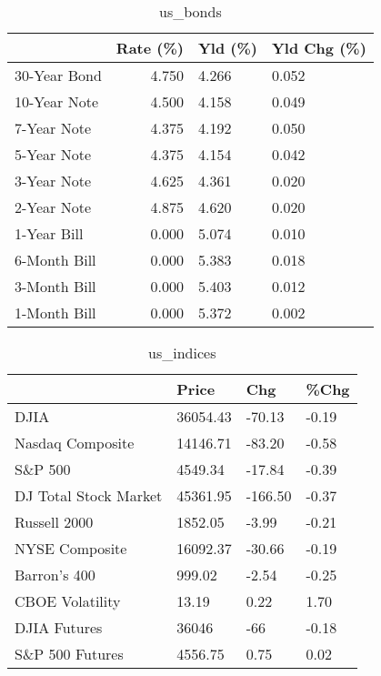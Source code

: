 \documentclass{article}%
\begin{document}
%


\begin{table}[htbp]%
\caption{us\_bonds}%
\centering%
\begin{adjustbox}{width=1\textwidth}%
\begin{tabular}{lrll}
\toprule
             &  Rate (\%) & Yld (\%) & Yld Chg (\%) \\
\midrule
30-Year Bond &     4.750 &   4.266 &       0.052 \\
10-Year Note &     4.500 &   4.158 &       0.049 \\
 7-Year Note &     4.375 &   4.192 &       0.050 \\
 5-Year Note &     4.375 &   4.154 &       0.042 \\
 3-Year Note &     4.625 &   4.361 &       0.020 \\
 2-Year Note &     4.875 &   4.620 &       0.020 \\
 1-Year Bill &     0.000 &   5.074 &       0.010 \\
6-Month Bill &     0.000 &   5.383 &       0.018 \\
3-Month Bill &     0.000 &   5.403 &       0.012 \\
1-Month Bill &     0.000 &   5.372 &       0.002 \\
\bottomrule
\end{tabular}
%
\end{adjustbox}%
\end{table}

%


\begin{table}[htbp]%
\caption{us\_indices}%
\centering%
\begin{adjustbox}{width=1\textwidth}%
\begin{tabular}{llll}
\toprule
                      &    Price &     Chg &  \%Chg \\
\midrule
                 DJIA & 36054.43 &  -70.13 & -0.19 \\
     Nasdaq Composite & 14146.71 &  -83.20 & -0.58 \\
              S\&P 500 &  4549.34 &  -17.84 & -0.39 \\
DJ Total Stock Market & 45361.95 & -166.50 & -0.37 \\
         Russell 2000 &  1852.05 &   -3.99 & -0.21 \\
       NYSE Composite & 16092.37 &  -30.66 & -0.19 \\
         Barron's 400 &   999.02 &   -2.54 & -0.25 \\
      CBOE Volatility &    13.19 &    0.22 &  1.70 \\
         DJIA Futures &    36046 &     -66 & -0.18 \\
      S\&P 500 Futures &  4556.75 &    0.75 &  0.02 \\
\bottomrule
\end{tabular}
%
\end{adjustbox}%
\end{table}
\end{document}
